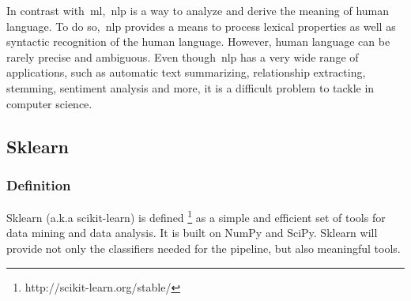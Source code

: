 In contrast with~\ac{ml},~\ac{nlp} is a way to analyze and derive the meaning of human language. To do so,~\ac{nlp} provides a means to process lexical properties as well as syntactic recognition of the human language. However, human language can be rarely precise and ambiguous. Even though~\ac{nlp} has a very wide range of applications, such as automatic text summarizing, relationship extracting, stemming, sentiment analysis and more, it is a difficult problem to tackle in computer science.

\subsection{Sklearn}
\subsubsection{Definition}
Sklearn (a.k.a scikit-learn) is defined \footnote{http://scikit-learn.org/stable/} as a simple and efficient set of tools for data mining and data analysis. It is built on NumPy and SciPy. Sklearn will provide not only the classifiers needed for the pipeline, but also meaningful tools.
